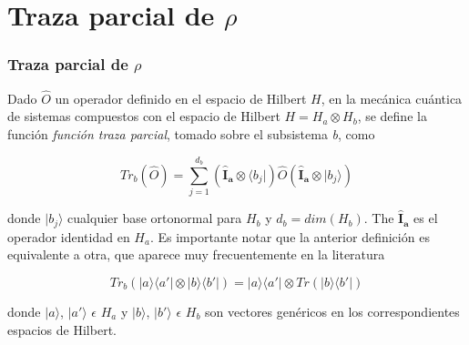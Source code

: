 \documentclass{beamer}
\begin{document}
\section{Traza parcial de $\rho$}

\begin{frame}
  \frametitle{Traza parcial de $\rho$}
  \small
  Dado $\hat{O}$ un operador definido en el espacio de Hilbert $H$, en la mecánica cuántica de sistemas compuestos 
  con el espacio de Hilbert $H = H_a \otimes H_b$, se define la función \textit{función
  traza parcial}, tomado sobre el subsistema \textit{b}, como 
  
  \begin{equation*}
    Tr_b(\hat{O}) = \sum_{j=1}^{d_b} (\bm{\hat{I}_a} \otimes \langle b_j|) \hat{O} (\bm{\hat{I}_a} \otimes |b_j \rangle)
  \end{equation*}
  
  donde $|b_j\rangle$ cualquier base ortonormal para $H_b$ y $d_b= dim(H_b)$. The $\bm{\hat{I}_a}$ es el operador identidad en $H_a$.
\pause
\vfill
  Es importante notar que la anterior definición es equivalente a otra, que aparece muy frecuentemente en la literatura 
  
  \begin{equation*}
    Tr_b( |a \rangle \langle a' | \otimes | b\rangle \langle b' | ) = |a \rangle \langle a' | \otimes Tr (|b\rangle \langle b' |)
  \end{equation*}
  
  donde $|a \rangle$, $|a' \rangle$ $\epsilon$ $H_a$ y $|b\rangle$, $|b'\rangle$ $\epsilon$ $H_b$ son vectores genéricos en 
  los correspondientes espacios de Hilbert.

\end{frame}
\end{document}
